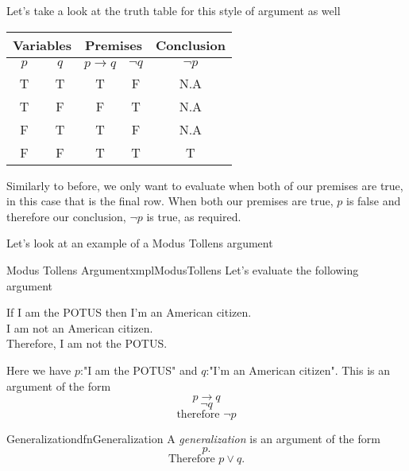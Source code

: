 Let's take a look at the truth table for this style of argument as well
\begin{center}
    \begin{tabular}{|c|c|c|c|c|}
        \hline
        \multicolumn{2}{|c|}{Variables} & \multicolumn{2}{|c|}{Premises} & Conclusion                         \\
        \hline
        $p$                             & $q$                            & $p \to q$  & $\lnot q$ & $\lnot p$ \\
        \hline
        T                               & T                              & T          & F         & N.A       \\
        \hline
        T                               & F                              & F          & T         & N.A       \\
        \hline
        F                               & T                              & T          & F         & N.A       \\
        \hline
        F                               & F                              & T          & T         & T         \\
        \hline
    \end{tabular}
\end{center}

Similarly to before, we only want to evaluate when both of our premises are true, in this case that is the final row. When both our premises are true, $p$ is false and therefore our conclusion, $\lnot p$ is true, as required.

Let's look at an example of a Modus Tollens argument

\begin{exmpl}[label={exmpl:modusTollens}]{Modus Tollens Argument}{xmplModusTollens}
    Let's evaluate the following argument
    \begin{center}
        If I am the POTUS then I'm an American citizen.\\
        I am not an American citizen.\\
        Therefore, I am not the POTUS.
    \end{center}
    Here we have $p$:"I am the POTUS" and $q$:"I'm an American citizen". This is an argument of the form
    $$p \to q$$
    $$\lnot q$$
    $$\text{therefore } \lnot p$$
\end{exmpl}

\begin{dfn}[label={def:generalization}]{Generalization}{dfnGeneralization}
    A \emph{generalization} is an argument of the form
    $$p.$$
    $$\text{Therefore } p \lor q.$$
\end{dfn}

